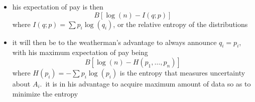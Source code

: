 \documentclass[../jaynes_prob_theory_notes.tex]{subfiles}
\begin{document}
\begin{itemize}
\begin{itemize}
                            \item his expectation of pay is then
                                \begin{equation*} 
                                    B[\log(n) - I(q; p)]
                                \end{equation*}
                                where \(I(q;p) = \sum p_i \log(q_i)\), or the relative entropy of the distributions
                            \item it will then be to the weatherman's advantage to always announce \(q_i = p_i\), with his maximum expectation of pay being
                                \begin{equation*} 
                                    B[\log(n) - H(p_1, \ldots, p_n)]
                                \end{equation*}
                                where \(H(p_i) = - \sum p_i \log(p_i)\) is the entropy that measures uncertainty about \(A_i\).\ it is in his advantage to acquire maximum amount of data so as to minimize the entropy
                        \end{itemize}
                \end{itemize}
    
\end{document}
